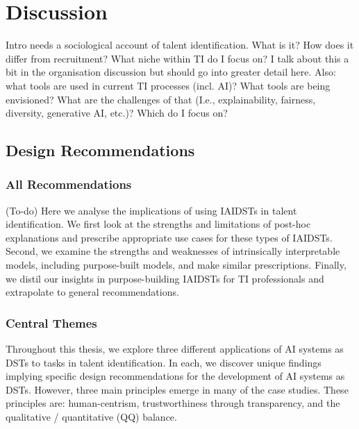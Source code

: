 

\chapter{\label{ch:discussion}Discussion}

\minitoc
Intro needs a sociological account of talent identification. What is it? How does it differ from recruitment? What niche within TI do I focus on? I talk about this a bit in the organisation discussion but should go into greater detail here.
Also: what tools are used in current TI processes (incl. AI)? What tools are being envisioned? What are the challenges of that (I.e., explainability, fairness, diversity, generative AI, etc.)? Which do I focus on?

\section{Design Recommendations}
\subsection{All Recommendations}
(To-do) Here we analyse the implications of using IAIDSTs in talent identification. We first look at the strengths and limitations of post-hoc explanations and prescribe appropriate use cases for these types of IAIDSTs. Second, we examine the strengths and weaknesses of intrinsically interpretable models, including purpose-built models, and make similar prescriptions. Finally, we distil our insights in purpose-building IAIDSTs for TI professionals and extrapolate to general recommendations.


\subsection{Central Themes}
Throughout this thesis, we explore three different applications of AI systems as DSTs to tasks in talent identification. In each, we discover unique findings implying specific design recommendations for the development of AI systems as DSTs. However, three main principles emerge in many of the case studies. These principles are: human-centrism, trustworthiness through transparency, and the qualitative / quantitative (QQ) balance.

